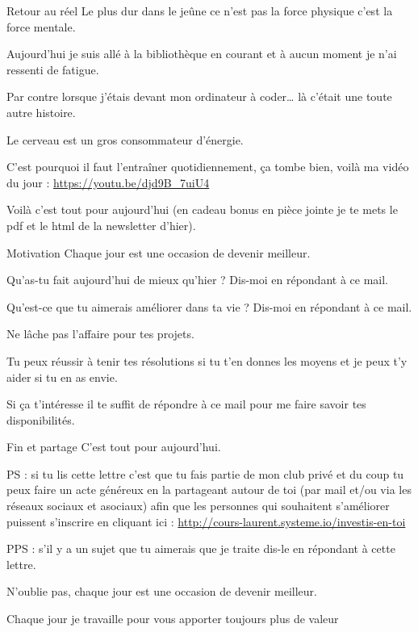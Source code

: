 \documentclass[presentation]{beamer}
\begin{document}
\begin{frame}[label={sec:orged47913}]{Retour au réel}
Le plus dur dans le jeûne ce n'est pas la force physique c'est la force mentale.



Aujourd'hui je suis allé à la bibliothèque en courant et à aucun moment je n'ai ressenti de fatigue.



Par contre lorsque j'étais devant mon ordinateur à coder\ldots{} là c'était une toute autre histoire.



Le cerveau est un gros consommateur d'énergie.



C'est pourquoi il faut l'entraîner quotidiennement, ça tombe bien, voilà ma vidéo du jour : \url{https://youtu.be/djd9B\_7uiU4}



Voilà c'est tout pour aujourd'hui (en cadeau bonus en pièce jointe je te mets le pdf et le html de la newsletter d'hier). 
\end{frame}

\begin{frame}[label={sec:orgd2017d9}]{Motivation}
Chaque jour est une occasion de devenir meilleur.



Qu'as-tu fait aujourd'hui de mieux qu'hier ? Dis-moi en répondant à ce mail.




Qu'est-ce que tu aimerais améliorer dans ta vie ? Dis-moi en répondant à ce mail.





Ne lâche pas l'affaire pour tes projets. 





Tu peux réussir à tenir tes résolutions si tu t'en donnes les moyens et je peux t'y aider si tu en as envie. 





Si ça t'intéresse il te suffit de répondre à ce mail pour me faire savoir tes disponibilités. 
\end{frame}




\begin{frame}[label={sec:org39c31f7}]{Fin et partage}
C'est tout pour aujourd'hui.



PS : si tu lis cette lettre c'est que tu fais partie de mon club privé et du coup tu peux faire un acte généreux en la partageant autour de toi (par mail et/ou via les réseaux sociaux et asociaux) afin que les personnes qui souhaitent s'améliorer puissent s'inscrire en cliquant ici : \url{http://cours-laurent.systeme.io/investis-en-toi}

PPS : s'il y a un sujet que tu aimerais que je traite dis-le en répondant à cette lettre.


N'oublie pas, chaque jour est une occasion de devenir meilleur.


Chaque jour je travaille pour vous apporter toujours plus de valeur
\end{frame}
\end{document}
